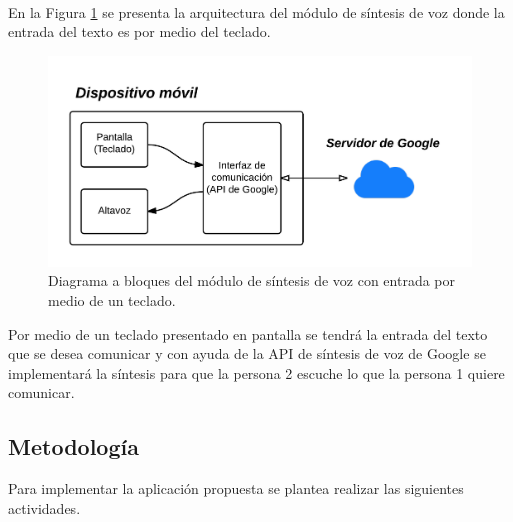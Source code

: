 		\paragraph{}

		En la Figura \ref{tecVozB} se presenta la arquitectura del módulo de síntesis de voz donde la entrada del texto es por medio del teclado.

		\begin{figure}[H]
			\centering
			\includegraphics[scale = 0.8]{figures/Etapateclado}
			\caption{Diagrama a bloques del módulo de síntesis de voz con entrada por medio de un teclado.}
			\label{tecVozB}
		\end{figure}	

		Por medio de un teclado presentado en pantalla se tendrá la entrada del texto que se desea comunicar y con ayuda de la API de síntesis de voz de Google  se implementará la síntesis para que la persona 2 escuche lo que la persona 1 quiere comunicar.





	\subsection*{Metodología}
	
	Para implementar la aplicación propuesta se plantea realizar las siguientes actividades.

